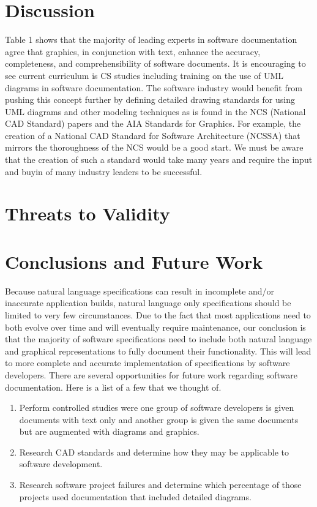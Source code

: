 \documentclass{acm_proc_article-sp}
\begin{document}
\section{Discussion}
Table 1 shows that the majority of leading experts in software documentation agree that graphics, in conjunction with text, enhance the accuracy, completeness, and comprehensibility of software documents. It is encouraging to see current curriculum is CS studies including training on the use of UML diagrams in software documentation. The software industry would benefit from pushing this concept further by defining detailed drawing standards for using UML diagrams and other modeling techniques as is found in the NCS (National CAD Standard) papers and the AIA Standards for Graphics. For example, the creation of a National CAD Standard for Software Architecture (NCSSA) that mirrors the thoroughness of the NCS would be a good start. We must be aware that the creation of such a standard would take many years and require the input and buyin of many industry leaders to be successful.

\section{Threats to Validity}

\section{Conclusions and Future Work}
Because natural language specifications can result in incomplete and/or inaccurate application builds, natural language only specifications should be limited to very few circumstances. Due to the fact that most applications need to both evolve over time and will eventually require maintenance, our conclusion is that the majority of software specifications need to include both natural language and graphical representations to fully document their functionality. This will lead to more complete and accurate implementation of specifications by software developers.
\newline
There are several opportunities for future work regarding software documentation. Here is a list of a few that we thought of.
\begin{enumerate}
	\item Perform controlled studies were one group of software developers is given documents with text only and another group is given the same documents but are augmented with diagrams and graphics.
	\item Research CAD standards and determine how they may be applicable to software development.
	\item Research software project failures and determine which percentage of those projects used documentation that included detailed diagrams. 
\end{enumerate}
\end{document}
